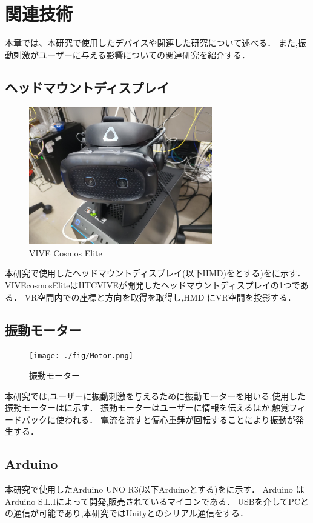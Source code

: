 \chapter{関連技術}

本章では、本研究で使用したデバイスや関連した研究について述べる．
また,振動刺激がユーザーに与える影響についての関連研究を紹介する．

\section{ヘッドマウントディスプレイ}

\begin{figure}[h]
\centering
\includegraphics[clip,width=8cm]{./fig/VIVE.png}
\caption{VIVE Cosmos Elite}\label{VIVE}
\end{figure}
本研究で使用したヘッドマウントディスプレイ(以下HMD)をとする)をに示す．
VIVEcosmosEliteはHTCVIVEが開発したヘッドマウントディスプレイの1つである．
VR空間内での座標と方向を取得を取得し,HMD にVR空間を投影する．




\newpage

\section{振動モーター}

\begin{figure}[h]
\centering
\texttt{[image: ./fig/Motor.png]}
\caption{振動モーター}\label{motor}
\end{figure}

本研究では,ユーザーに振動刺激を与えるために振動モーターを用いる.使用した振動モーターはに示す．
振動モーターはユーザーに情報を伝えるほか,触覚フィードバックに使われる．
電流を流すと偏心重錘が回転することにより振動が発生する．


\section{Arduino}
本研究で使用したArduino UNO R3\cite{arduino}(以下Arduinoとする)をに示す．
Arduino はArduino S.L.Iによって開発,販売されているマイコンである．
USBを介してPCとの通信が可能であり,本研究ではUnityとのシリアル通信をする．

